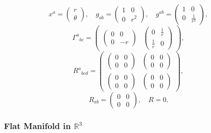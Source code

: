 \documentclass[11pt]{article}
\let\mathbbalt\mathbb
\let\mathbb\mathbbalt
\newcommand{\prompt}[4]{
        {\ttfamily\llap{{\color{#2}[#3]:\hspace{3pt}#4}}\vspace{-\baselineskip}}
    }
\begin{document}
            
\prompt{Out}{outcolor}{5}{}
    
    $$x^{a}=\begin{pmatrix}r\\\theta\end{pmatrix},\quad g_{ab}=\begin{pmatrix} 1 & 0\\ 0 & r^{2} \end{pmatrix},\quad g^{ab}=\begin{pmatrix} 1 & 0\\ 0 & \frac{1}{r^{2}} \end{pmatrix},$$
$${\Gamma^{a}}_{bc}=\begin{pmatrix} \begin{pmatrix} 0 & 0\\ 0 & - r \end{pmatrix} & \begin{pmatrix} 0 & \frac{1}{r}\\ \frac{1}{r} & 0 \end{pmatrix} \end{pmatrix},$$
$${R^{a}}_{bcd}=\begin{pmatrix} \begin{pmatrix} 0 & 0\\ 0 & 0 \end{pmatrix} & \begin{pmatrix} 0 & 0\\ 0 & 0 \end{pmatrix}\\ \begin{pmatrix} 0 & 0\\ 0 & 0 \end{pmatrix} & \begin{pmatrix} 0 & 0\\ 0 & 0 \end{pmatrix} \end{pmatrix},$$
$$R_{ab}=\begin{pmatrix} 0 & 0\\ 0 & 0 \end{pmatrix},\quad R=0.$$

    
\newpage %


    \hypertarget{flat-manifold-in-mathbbr3}{%
\subsubsection{\texorpdfstring{Flat Manifold in
\(\mathbb{R}^3\)}{Flat Manifold in \textbackslash mathbb\{R\}\^{}3}}\label{flat-manifold-in-mathbbr3}}
\end{document}
